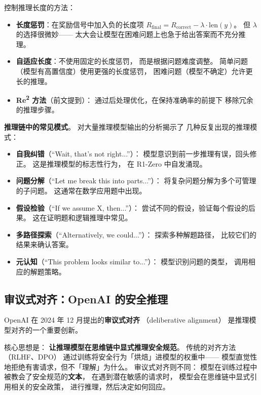 控制推理长度的方法：
\begin{itemize}[noitemsep]
  \item \textbf{长度惩罚}：在奖励信号中加入负的长度项
        $R_{\text{final}} = R_{\text{correct}} - \lambda \cdot \text{len}(y)$。
        但 $\lambda$ 的选择很微妙——
        太大会让模型在困难问题上也急于给出答案而不充分推理。
  \item \textbf{自适应长度}：不使用固定的长度惩罚，
        而是根据问题难度调整。
        简单问题（模型有高置信度）使用更强的长度惩罚，
        困难问题（模型不确定）允许更长的推理。
  \item \textbf{Re\textsuperscript{2} 方法}（前文提到）：
        通过后处理优化，在保持准确率的前提下
        移除冗余的推理步骤。
\end{itemize}

\textbf{推理链中的常见模式}。
对大量推理模型输出的分析揭示了
几种反复出现的推理模式：
\begin{itemize}[noitemsep]
  \item \textbf{自我纠错}（“Wait, that's not right...”）：
        模型意识到前一步推理有误，回头修正。
        这是推理模型的标志性行为，
        在 R1-Zero 中自发涌现。
  \item \textbf{问题分解}（“Let me break this into parts...”）：
        将复杂问题分解为多个可管理的子问题。
        这通常在数学应用题中出现。
  \item \textbf{假设检验}（“If we assume X, then...”）：
        尝试不同的假设，验证每个假设的后果。
        这在证明题和逻辑推理中常见。
  \item \textbf{多路径探索}（“Alternatively, we could...”）：
        探索多种解题路径，
        比较它们的结果来确认答案。
  \item \textbf{元认知}（“This problem looks similar to...”）：
        模型识别问题的类型，
        调用相应的解题策略。
\end{itemize}

\subsection{审议式对齐：OpenAI 的安全推理}


OpenAI 在 2024 年 12 月提出的\textbf{审议式对齐}
（deliberative alignment）
是推理模型对齐的一个重要创新。

核心思想是：
\textbf{让推理模型在思维链中显式推理安全规范}。
传统的对齐方法（RLHF、DPO）
通过训练将安全行为「烘焙」进模型的权重中——
模型直觉性地拒绝有害请求，但不「理解」为什么。
审议式对齐则不同：
模型在训练过程中被教会了安全规范的\textbf{文本}，
在遇到潜在敏感的请求时，
模型会在思维链中显式引用相关的安全政策，
进行推理，然后决定如何回应。

